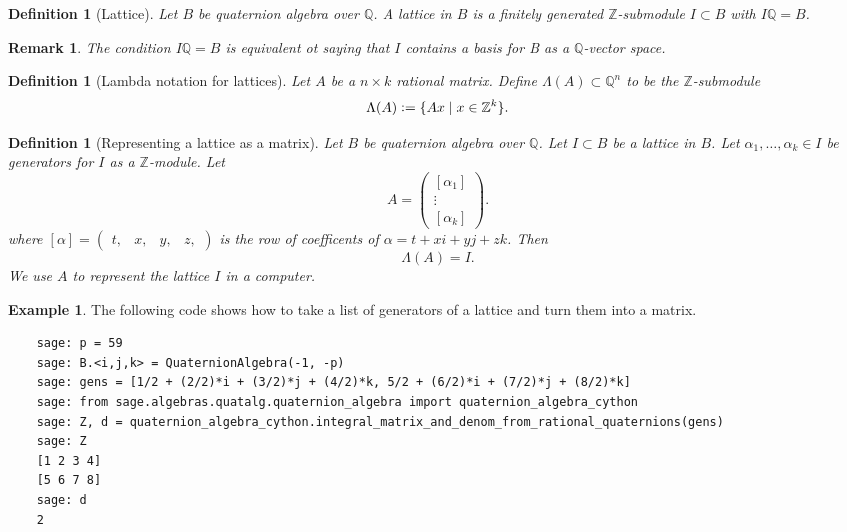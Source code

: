 \documentclass[10pt]{article}
\theoremstyle{plain}
\newtheorem{remark}[theorem]{Remark}
\newtheorem{definition}[theorem]{Definition}
\theoremstyle{definition}
\newtheorem{example}[theorem]{Example}
\newcommand{\Z}{\mathbb{Z}}
\newcommand{\Q}{\mathbb{Q}}
\begin{document}
\begin{definition}[Lattice]
    Let \( B \) be quaternion algebra over \( \Q \).
    A \emph{lattice} in \( B \) is a finitely generated \( \Z \)-submodule \( I \subset B \) with \( I\Q = B \).
\end{definition}

\begin{remark}
    The condition \( I\Q = B \) is equivalent ot saying that \( I \) contains a basis for B as a \( \Q \)-vector space.
\end{remark}

\begin{definition}[Lambda notation for lattices]
    Let \( A \) be a \( n \times k \) rational matrix.
    Define \( \Lambda(A) \subset \Q^n \) to be the \( \Z \)-submodule
    \[
        \Lambda(A) \vcentcolon = \{ Ax \mid x \in \Z^k \}.
    \]
\end{definition}

\begin{definition}[Representing a lattice as a matrix]
    Let \( B \) be quaternion algebra over \( \Q \).
    Let \( I \subset B \) be a lattice in \( B \).
    Let \( \alpha_1, \dots , \alpha_k \in I\) be generators for \( I \) as a \( \Z \)-module.
    Let
    \[
        A =
        \begin{pmatrix}
            [\alpha_1] \\  \vdots \\ [\alpha_k]
        \end{pmatrix}.
    \]
    where \( [\alpha] =  \begin{pmatrix} t, & x, & y, & z, \end{pmatrix} \) is the row of coefficents of \( \alpha = t + xi + yj + zk \).
    Then
    \[
        \Lambda(A) = I.
    \]
    We use \( A \) to represent the lattice \( I \) in a computer.
\end{definition}


\begin{example}
    The following code shows how to take a list of generators of a lattice and turn them into a matrix.
    \begin{lstlisting}
    sage: p = 59
    sage: B.<i,j,k> = QuaternionAlgebra(-1, -p)
    sage: gens = [1/2 + (2/2)*i + (3/2)*j + (4/2)*k, 5/2 + (6/2)*i + (7/2)*j + (8/2)*k]
    sage: from sage.algebras.quatalg.quaternion_algebra import quaternion_algebra_cython
    sage: Z, d = quaternion_algebra_cython.integral_matrix_and_denom_from_rational_quaternions(gens)
    sage: Z
    [1 2 3 4]
    [5 6 7 8]
    sage: d
    2
  \end{lstlisting}
\end{example}
\end{document}
